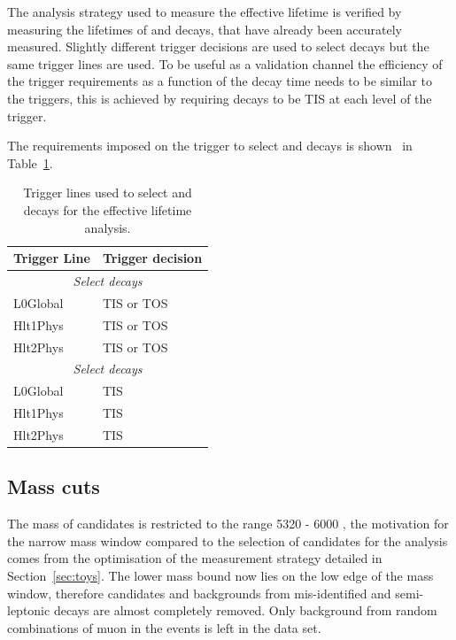 The analysis strategy used to measure the \bsmumu effective lifetime is verified by measuring the lifetimes of \bdkpi and \bskk decays, that have already been accurately measured. Slightly different trigger decisions are used to select \bhh decays but the same trigger lines are used. To be useful as a validation channel the efficiency of the trigger requirements as a function of the decay time needs to be similar to the \bsmumu triggers, this is achieved by requiring \bhh decays to be TIS at each level of the trigger.

The requirements imposed on the trigger to select \bsmumu and \bhh decays is shown \
in Table~\ref{tab:ELtriggers}.

\begin{table}[htbp]
\begin{center}
\begin{tabular}{ll}
\hline
Trigger Line    & Trigger decision \\ \hline
\multicolumn{2}{c}{{\it Select \bsmumu decays}} \\ \hline
L0Global        & TIS or TOS \\
Hlt1Phys        & TIS or TOS \\
Hlt2Phys        & TIS or TOS \\ \hline
\multicolumn{2}{c}{{\it Select \bhh decays}} \\ \hline
L0Global        & TIS\\
Hlt1Phys        & TIS \\
Hlt2Phys        & TIS \\ \hline
\end{tabular}
\vspace{0.7cm}
\caption{Trigger lines used to select \bsmumu and \bhh decays for the \bsmumu effective lifetime analysis.}
\label{tab:ELtriggers}
\end{center}
\vspace{-1.0cm}
\end{table}


\subsection{Mass cuts}
\label{sec:ELmass}
The mass of \bsmumu candidates is restricted to the range 5320 - 6000 \mevcc, the motivation for the narrow mass window compared to the selection of candidates for the \BF analysis comes from the optimisation of the measurement strategy detailed in Section~\ref{sec:toys}. The lower mass bound now lies on the low edge of the \bs mass window, therefore \bdmumu candidates and backgrounds from mis-identified \bhh and semi-leptonic decays are almost completely removed. Only background from random combinations of muon in the events is left in the data set.  

